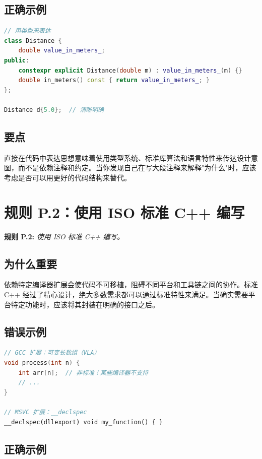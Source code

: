 \subsection{正确示例}

\begin{lstlisting}[language=C++]
// 用类型来表达
class Distance {
    double value_in_meters_;
public:
    constexpr explicit Distance(double m) : value_in_meters_(m) {}
    double in_meters() const { return value_in_meters_; }
};

Distance d{5.0};  // 清晰明确
\end{lstlisting}

\subsection{要点}
直接在代码中表达思想意味着使用类型系统、标准库算法和语言特性来传达设计意图，而不是依赖注释和约定。当你发现自己在写大段注释来解释"为什么"时，应该考虑是否可以用更好的代码结构来替代。

\section{规则 P.2：使用 ISO 标准 C++ 编写}

\textbf{规则 P.2:} \textit{使用 ISO 标准 C++ 编写。}

\subsection{为什么重要}

依赖特定编译器扩展会使代码不可移植，阻碍不同平台和工具链之间的协作。标准 C++ 经过了精心设计，绝大多数需求都可以通过标准特性来满足。当确实需要平台特定功能时，应该将其封装在明确的接口之后。

\subsection{错误示例}

\begin{lstlisting}[language=C++]
// GCC 扩展：可变长数组（VLA）
void process(int n) {
    int arr[n];  // 非标准！某些编译器不支持
    // ...
}

// MSVC 扩展：__declspec
__declspec(dllexport) void my_function() { }
\end{lstlisting}

\subsection{正确示例}

